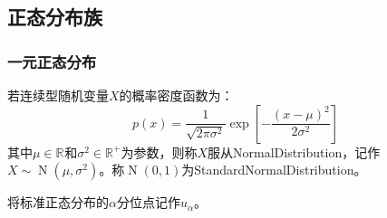 \subsection{正态分布族}
\subsubsection{一元正态分布}
\begin{definition}
	若连续型随机变量$X$的概率密度函数为：
	\begin{equation*}
		p(x)=\frac{1}{\sqrt{2\pi\sigma^2}}\exp\left[-\frac{(x-\mu)^2}{2\sigma^2}\right]
	\end{equation*}
	其中$\mu\in\mathbb{R}^{}$和$\sigma^2\in\mathbb{R}^{+}$为参数，则称$X$服从\gls{NormalDistribution}，记作$X\sim\operatorname{N}(\mu,\sigma^2)$。称$\operatorname{N}(0,1)$为\gls{StandardNormalDistribution}。
\end{definition}
\begin{note}
	将标准正态分布的$\alpha$分位点记作$u_{\alpha}$。
\end{note}
